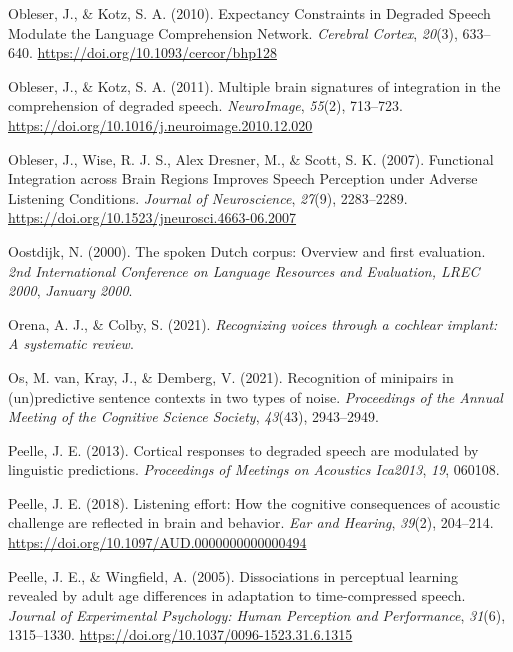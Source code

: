 \documentclass[a4paper, nobind]{templates/ociamthesis}
\newlength{\cslhangindent}
\newenvironment{CSLReferences}[2] %
 {%
  \setlength{\parindent}{0pt}
  \ifodd #1
  \let\oldpar\par
  \def\par{\hangindent=\cslhangindent\oldpar}
  \fi
  \setlength{\parskip}{1mm}
  \setlength{\baselineskip}{6mm}
 }%
 {}
\begin{document}
\begin{CSLReferences}{1}{0}
\leavevmode{}%
Obleser, J., \& Kotz, S. A. (2010). Expectancy Constraints in Degraded Speech Modulate the Language Comprehension Network. \emph{Cerebral Cortex}, \emph{20}(3), 633--640. \url{https://doi.org/10.1093/cercor/bhp128}

\leavevmode{}%
Obleser, J., \& Kotz, S. A. (2011). Multiple brain signatures of integration in the comprehension of degraded speech. \emph{NeuroImage}, \emph{55}(2), 713--723. \url{https://doi.org/10.1016/j.neuroimage.2010.12.020}

\leavevmode{}%
Obleser, J., Wise, R. J. S., Alex Dresner, M., \& Scott, S. K. (2007). Functional Integration across Brain Regions Improves Speech Perception under Adverse Listening Conditions. \emph{Journal of Neuroscience}, \emph{27}(9), 2283--2289. \url{https://doi.org/10.1523/jneurosci.4663-06.2007}

\leavevmode{}%
Oostdijk, N. (2000). {The spoken Dutch corpus: Overview and first evaluation}. \emph{2nd International Conference on Language Resources and Evaluation, LREC 2000}, \emph{January 2000}.

\leavevmode{}%
Orena, A. J., \& Colby, S. (2021). \emph{Recognizing voices through a cochlear implant: A systematic review}.

\leavevmode{}%
Os, M. van, Kray, J., \& Demberg, V. (2021). {Recognition of minipairs in (un)predictive sentence contexts in two types of noise}. \emph{Proceedings of the Annual Meeting of the Cognitive Science Society}, \emph{43}(43), 2943--2949.

\leavevmode{}%
Peelle, J. E. (2013). Cortical responses to degraded speech are modulated by linguistic predictions. \emph{Proceedings of Meetings on Acoustics Ica2013}, \emph{19}, 060108.

\leavevmode{}%
Peelle, J. E. (2018). {Listening effort: How the cognitive consequences of acoustic challenge are reflected in brain and behavior}. \emph{Ear and Hearing}, \emph{39}(2), 204--214. \url{https://doi.org/10.1097/AUD.0000000000000494}

\leavevmode{}%
Peelle, J. E., \& Wingfield, A. (2005). {Dissociations in perceptual learning revealed by adult age differences in adaptation to time-compressed speech}. \emph{Journal of Experimental Psychology: Human Perception and Performance}, \emph{31}(6), 1315--1330. \url{https://doi.org/10.1037/0096-1523.31.6.1315}


\end{CSLReferences}
\end{document}

